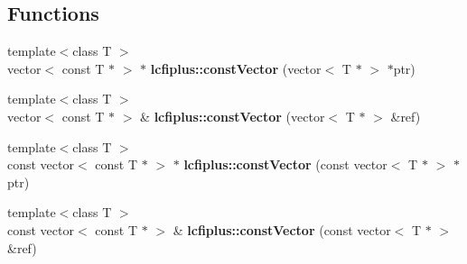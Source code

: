 \subsection*{Functions}
\begin{DoxyCompactItemize}
\item 
{\footnotesize template$<$class T $>$ }\\vector$<$ const T $\ast$ $>$ $\ast$ {\bf lcfiplus\-::const\-Vector} (vector$<$ T $\ast$ $>$ $\ast$ptr)
\item 
{\footnotesize template$<$class T $>$ }\\vector$<$ const T $\ast$ $>$ \& {\bf lcfiplus\-::const\-Vector} (vector$<$ T $\ast$ $>$ \&ref)
\item 
{\footnotesize template$<$class T $>$ }\\const vector$<$ const T $\ast$ $>$ $\ast$ {\bf lcfiplus\-::const\-Vector} (const vector$<$ T $\ast$ $>$ $\ast$ptr)
\item 
{\footnotesize template$<$class T $>$ }\\const vector$<$ const T $\ast$ $>$ \& {\bf lcfiplus\-::const\-Vector} (const vector$<$ T $\ast$ $>$ \&ref)
\end{DoxyCompactItemize}
